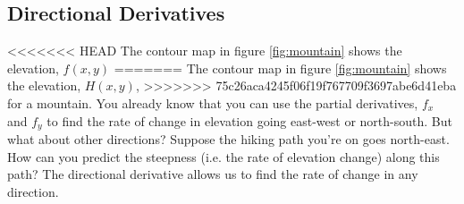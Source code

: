 \subsection{Directional Derivatives}
<<<<<<< HEAD
The contour map in figure \ref{fig:mountain} shows the elevation, $f(x, y)$ 
=======
The contour map in figure \ref{fig:mountain} shows the elevation, $H(x, y)$, 
>>>>>>> 75c26aca4245f06f19f767709f3697abe6d41eba
for a mountain. You already know that you can use the partial derivatives, 
$f_x$ and $f_y$ to find the rate of change in elevation going east-west or 
north-south. But what about other directions? Suppose the hiking path you're 
on goes north-east. How can you predict the steepness (i.e. the rate of 
elevation change) along this path? The directional derivative allows us to 
find the rate of change in any direction. 

